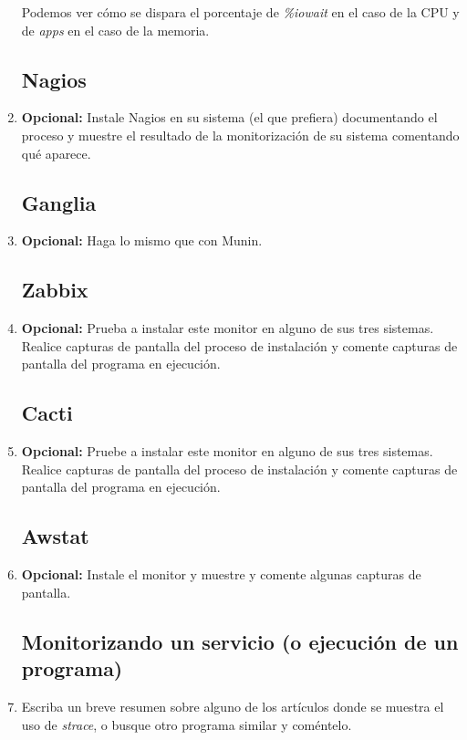 \documentclass[paper=a4, fontsize=11pt]{scrartcl} %
\numberwithin{equation}{section} %
\numberwithin{figure}{section} %
\numberwithin{table}{section} %
\begin{document}
\begin{enumerate}
		Podemos ver cómo se dispara el porcentaje de \textit{\%iowait} en el caso de la CPU y de
		\textit{apps} en el caso de la memoria.
		
	\subsection{Nagios}
		\item \textbf{Opcional:} Instale Nagios en su sistema (el que prefiera) documentando el
		proceso y muestre el resultado de la monitorización de su sistema comentando qué aparece.
		
	\subsection{Ganglia}
		\item \textbf{Opcional:} Haga lo mismo que con Munin.
		
	\subsection{Zabbix}
		\item \textbf{Opcional:} Prueba a instalar este monitor en alguno de sus tres sistemas.
		Realice capturas de pantalla del proceso de instalación y comente capturas de pantalla
		del programa en ejecución.
		
	\subsection{Cacti}
		\item \textbf{Opcional:} Pruebe a instalar este monitor en alguno de sus tres sistemas.
		Realice capturas de pantalla del proceso de instalación y comente capturas de pantalla
		del programa en ejecución.
		
	\subsection{Awstat}
		\item \textbf{Opcional:} Instale el monitor y muestre y comente algunas capturas de pantalla.
		
	\subsection{Monitorizando un servicio (o ejecución de un programa)}
		\item Escriba un breve resumen sobre alguno de los artículos donde se muestra el uso de
		\textit{strace}, o busque otro programa similar y coméntelo.
		

\end{enumerate}
\end{document}
